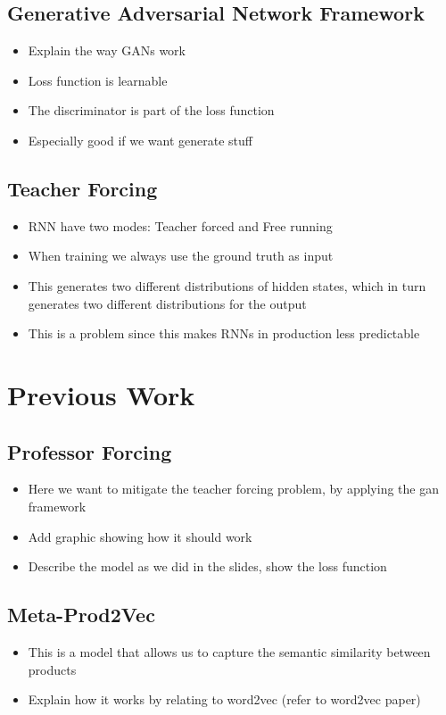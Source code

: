 \subsection{Generative Adversarial Network Framework}
\begin{itemize}
    \item Explain the way GANs work
    \item Loss function is learnable
    \item The discriminator is part of the loss function
    \item Especially good if we want generate stuff
\end{itemize}
\subsection{Teacher Forcing}
\begin{itemize}
    \item RNN have two modes: Teacher forced and Free running
    \item When training we always use the ground truth as input
    \item This generates two different distributions of hidden states, which in turn generates two different distributions for the output
    \item This is a problem since this makes RNNs in production less predictable
\end{itemize}

\section{Previous Work}
\subsection{Professor Forcing}
\begin{itemize}
    \item Here we want to mitigate the teacher forcing problem, by applying the gan framework
    \item Add graphic showing how it should work
    \item Describe the model as we did in the slides, show the loss function
\end{itemize}
\cite{profforce}
\subsection{Meta-Prod2Vec}
\begin{itemize}
    \item This is a model that allows us to capture the semantic similarity between products
    \item Explain how it works by relating to word2vec (refer to word2vec paper)
\end{itemize}
\cite{prod2vec}
